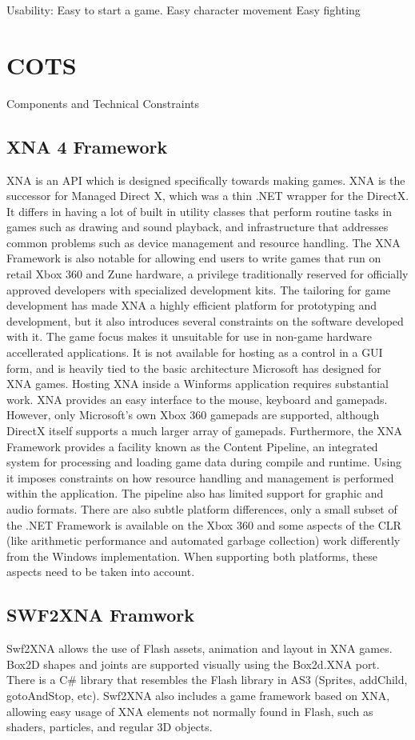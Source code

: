 Usability:
Easy to start a game.
Easy character movement
Easy fighting

\chapter{COTS}
Components and Technical Constraints
\section{XNA 4 Framework}
XNA is an API which is designed specifically towards making games. XNA is the successor for Managed Direct X, which was a thin .NET wrapper for the DirectX. It differs in having a lot of built in utility classes that perform routine tasks in games such as drawing and sound playback, and infrastructure that addresses common problems such as device management and resource handling. The XNA Framework is also notable for allowing end users to write games that run on retail Xbox 360 and Zune hardware, a privilege traditionally reserved for officially approved developers with specialized development kits. The tailoring for game development has made XNA a highly efficient platform for prototyping and development, but it also introduces several constraints on the software developed with it. The game focus makes it unsuitable for use in non-game hardware accellerated applications. It is not available for hosting as a control in a GUI form, and is heavily tied to the basic architecture Microsoft has designed for XNA games. Hosting XNA inside a Winforms application requires substantial work. XNA provides an easy interface to the mouse, keyboard and gamepads. However, only Microsoft's own Xbox 360 gamepads are supported, although DirectX itself supports a much larger array of gamepads. Furthermore, the XNA Framework provides a facility known as the Content Pipeline, an integrated system for processing and loading game data during compile and runtime. Using it imposes constraints on how resource handling and management is performed within the application. The pipeline also has limited support for graphic and audio formats. There are also subtle platform differences, only a small subset of the .NET Framework is available on the Xbox 360 and some aspects of the CLR (like arithmetic performance and automated garbage collection) work differently from the Windows implementation. When supporting both platforms, these aspects need to be taken into account.

\section{SWF2XNA Framwork}
Swf2XNA allows the use of Flash assets, animation and layout in XNA games. Box2D shapes and joints are supported visually using the Box2d.XNA port. There is a C\# library that resembles the Flash library in AS3 (Sprites, addChild, gotoAndStop, etc). Swf2XNA also includes a game framework based on XNA, allowing easy usage of XNA elements not normally found in Flash, such as shaders, particles, and regular 3D objects.

